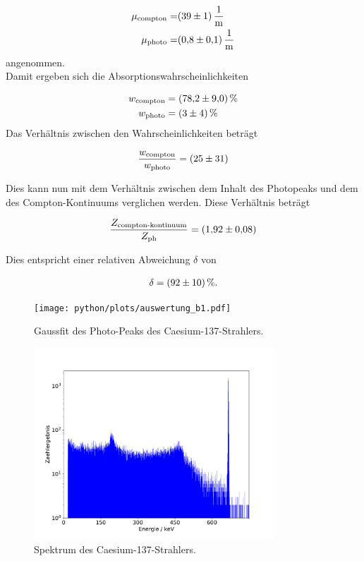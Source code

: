 \begin{align*}
  \mu_\text{compton} = &\SI{39+-1}{\per\meter}\\
  \mu_\text{photo} = &\SI{0.8+-0.1}{\per\meter}
\end{align*}
angenommen. \\
Damit ergeben sich die Absorptionswahrscheinlichkeiten

\begin{align*}
  w_\text{compton} &= \SI{78.2+-9.0}{\percent}\\
  w_\text{photo} &= \SI{3+-4}{\percent}
\end{align*}
Das Verhältnis zwischen den Wahrscheinlichkeiten beträgt

\begin{align*}
    \frac{w_\text{compton}}{w_\text{photo}} = \SI{25+-31} .
\end{align*}

Dies kann nun mit dem Verhältnis zwischen dem Inhalt des Photopeaks und dem des Compton-Kontinuums verglichen werden.
Diese Verhältnis beträgt

\begin{align*}
  \frac{Z_\text{compton-kontinuum}}{Z_\text{ph}} = \SI{1.92+-0.08} .
\end{align*}

Dies entspricht einer relativen Abweichung $\delta$ von

\begin{align*}
  \delta = \SI{92+-10}{\percent} .
\end{align*}

\begin{figure}
  \centering
  \texttt{[image: python/plots/auswertung\_b1.pdf]}
  \caption{Gaussfit des Photo-Peaks des Caesium-137-Strahlers.}
  \label{fig:gfit2}
\end{figure}

\begin{figure}
  \centering
  \includegraphics[width=0.8\textwidth]{python/plots/spec2.pdf}
  \caption{Spektrum des Caesium-137-Strahlers.}
  \label{fig:spectrum_caesium}
\end{figure}

